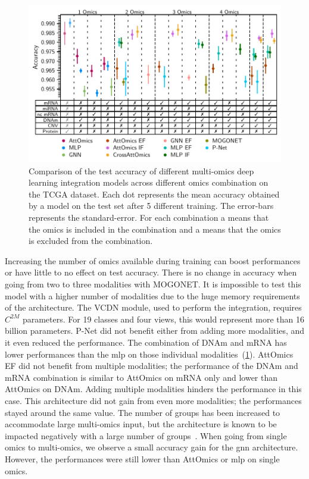 \documentclass[../main.tex]{subfiles}
\begin{document}
		\begin{figure}[htbp]
			\centering
			\includegraphics[width=1\textwidth]{tcga_perf_omics_comb.pdf}
			\caption[Comparison of the test accuracy of different multi-omics deep learning integration models on TCGA data]{Comparison of the test accuracy of different multi-omics deep learning integration models across different omics combination on the TCGA dataset. Each dot represents the mean accuracy obtained by a model on the test set after 5 different training. The error-bars represents the standard-error. For each combination a \cmark means that the omics is included in the combination and a \xmark means that the omics is excluded from the combination.}\label{fig:tcga_perf_comb}
		\end{figure}

		Increasing the number of omics available during training can boost performances or have little to no effect on test accuracy.
		There is no change in accuracy when going from two to three modalities with MOGONET\@.
		It is impossible to test this model with a higher number of modalities due to the huge memory requirements of the architecture.
		The VCDN module, used to perform the integration, requires \(C^{2M}\) parameters.
		For 19 classes and four views, this would represent more than 16 billion parameters.
		P-Net did not benefit either from adding more modalities, and it even reduced the performance.
		The combination of DNAm and mRNA has lower performances than the \gls{mlp} on those individual modalities~(\cref{fig:tcga_perf_comb}).
		AttOmics EF did not benefit from multiple modalities; the performance of the DNAm and mRNA combination is similar to AttOmics on mRNA only and lower than AttOmics on DNAm.
		Adding multiple modalities hinders the performance in this case.
		This architecture did not gain from even more modalities; the performances stayed around the same value.
		The number of groups has been increased to accommodate large multi-omics input, but the architecture is known to be impacted negatively with a large number of groups~\cite{AttOmics}.
		When going from single omics to multi-omics, we observe a small accuracy gain for the \gls{gnn} architecture.
		However, the performances were still lower than AttOmics or \gls{mlp} on single omics.
\end{document}
